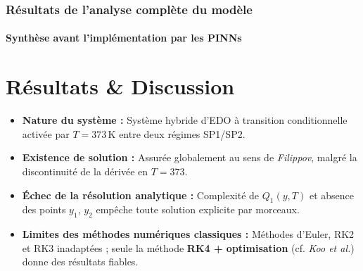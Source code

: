 \documentclass[handout]{beamer}
\newtheorem{pbm et hypo}[thm]{Problématique et hypothèses}
\begin{document}
	\begin{frame}
		\frametitle{Résultats de l'analyse complète du modèle}
		\framesubtitle{Synthèse avant l'implémentation par les PINNs}
		\section{Résultats \& Discussion}
		
		\begin{itemize}
			\item[\maltese] \textbf{Nature du système :} Système hybride d'EDO à transition conditionnelle activée par $T = 373\,\mathrm{K}$ entre deux régimes SP1/SP2.
			
			\item[\maltese] \textbf{Existence de solution :} Assurée globalement au sens de \textit{Filippov}, malgré la discontinuité de la dérivée en $T = 373$.
			
			\item[\maltese] \textbf{Échec de la résolution analytique :} Complexité de $Q_1(y,T)$ et absence des points $y_1$, $y_2$ empêche toute solution explicite par morceaux.
			
			\item[\maltese] \textbf{Limites des méthodes numériques classiques :}  
			Méthodes d'Euler, RK2 et RK3 inadaptées ; seule la méthode \textbf{RK4 + optimisation} (cf. \textit{Koo et al.}) donne des résultats fiables.
		\end{itemize}
		
	\end{frame}
	
\end{document}
